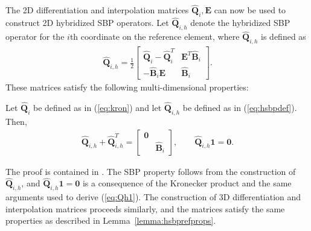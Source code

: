 \documentclass{svjour3}                     %
\renewcommand{\hat}{\widehat}
\renewcommand{\tilde}{\widetilde}
\newcommand{\td}[2]{\frac{{\rm d}#1}{{\rm d}{\rm #2}}}
\newcommand{\LRp}[1]{\left( #1 \right)}
\begin{document}
The 2D differentiation and interpolation matrices $\hat{\bm{Q}}_i, \bm{E}$ can now be used to construct 2D hybridized SBP operators.  Let $\hat{\bm{Q}}_{i,h}$ denote the hybridized SBP operator for the $i$th coordinate on the reference element, where $\hat{\bm{Q}}_{i,h}$ is defined as
\begin{align}
\hat{\bm{Q}}_{i,h} = \frac{1}{2}\begin{bmatrix}
\hat{\bm{Q}}_i - \hat{\bm{Q}}_i^T & \bm{E}^T\hat{\bm{B}}_i\\
-\hat{\bm{B}}_i\bm{E} & \hat{\bm{B}}_i
\end{bmatrix}.
\label{eq:hsbpdef}
\end{align}
These matrices satisfy the following multi-dimensional properties:
\begin{lemma}
\label{lemma:hsbprefprops}
Let $\hat{\bm{Q}}_{i}$ be defined as in (\ref{eq:kron}) and let $\hat{\bm{Q}}_{i,h}$ be defined as in (\ref{eq:hsbpdef}).  Then, 
\begin{align}
\hat{\bm{Q}}_{i,h} + \hat{\bm{Q}}_{i,h}^T = \begin{bmatrix}
\bm{0} & \\
& \hat{\bm{B}}_i
\end{bmatrix}, \qquad \hat{\bm{Q}}_{i,h}\bm{1} = \bm{0}.
\end{align}
\end{lemma}
The proof is contained in \cite{chan2018efficient}.  The SBP property follows from the construction of $\hat{\bm{Q}}_{i,h}$, and $\hat{\bm{Q}}_{i,h}\bm{1} = \bm{0}$ is a consequence of the Kronecker product and the same arguments used to derive (\ref{eq:Qh1}).  The construction of 3D differentiation and interpolation matrices proceeds similarly, and the matrices satisfy the same properties as described in Lemma~\ref{lemma:hsbprefprops}.  

\end{document}
